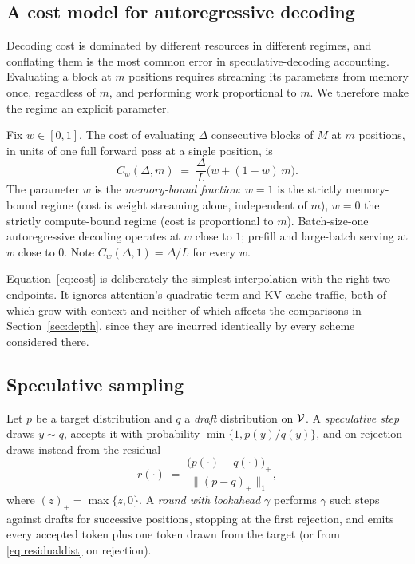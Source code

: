 \subsection{A cost model for autoregressive decoding}

Decoding cost is dominated by different resources in different regimes, and
conflating them is the most common error in speculative-decoding accounting.
Evaluating a block at $m$ positions requires streaming its parameters from
memory once, regardless of $m$, and performing work proportional to $m$. We
therefore make the regime an explicit parameter.

\begin{definition}
\label{def:cost}
Fix $w \in [0,1]$. The cost of evaluating $\Delta$ consecutive blocks of $M$ at
$m$ positions, in units of one full forward pass at a single position, is
\begin{equation}
  C_w(\Delta, m) \;=\; \frac{\Delta}{L}\Big( w + (1-w)\, m \Big) .
  \label{eq:cost}
\end{equation}
The parameter $w$ is the \emph{memory-bound fraction}: $w=1$ is the strictly
memory-bound regime (cost is weight streaming alone, independent of $m$),
$w=0$ the strictly compute-bound regime (cost is proportional to $m$).
Batch-size-one autoregressive decoding operates at $w$ close to $1$; prefill and
large-batch serving at $w$ close to $0$. Note $C_w(\Delta,1) = \Delta/L$ for
every $w$.
\end{definition}

\begin{remark}
Equation~\eqref{eq:cost} is deliberately the simplest interpolation with the
right two endpoints. It ignores attention's quadratic term and KV-cache traffic,
both of which grow with context and neither of which affects the comparisons in
Section~\ref{sec:depth}, since they are incurred identically by every scheme
considered there.
\end{remark}

\subsection{Speculative sampling}

\begin{definition}
\label{def:specround}
Let $p$ be a target distribution and $q$ a \emph{draft} distribution on
$\mathcal{V}$. A \emph{speculative step} draws $y \sim q$, accepts it with
probability $\min\{1, p(y)/q(y)\}$, and on rejection draws instead from the
residual
\begin{equation}
  r(\cdot) \;=\; \frac{\big(p(\cdot) - q(\cdot)\big)_+}{\big\|(p-q)_+\big\|_1},
  \label{eq:residualdist}
\end{equation}
where $(z)_+ = \max\{z,0\}$. A \emph{round with lookahead $\gamma$} performs
$\gamma$ such steps against drafts for successive positions, stopping at the
first rejection, and emits every accepted token plus one token drawn from the
target (or from \eqref{eq:residualdist} on rejection).
\end{definition}

